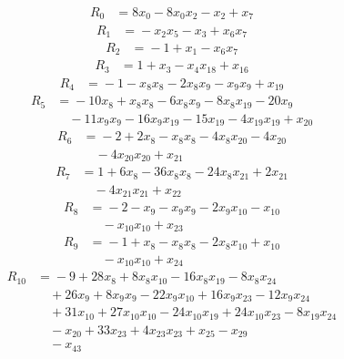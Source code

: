 \begingroup\small
\begin{align*}
R_{0}&={}8x_{0} -8x_{0}x_{2} -x_{2} +x_{7}
\end{align*}
\begin{align*}
R_{1}&={}-x_{2}x_{5} -x_{3} +x_{6}x_{7}
\end{align*}
\begin{align*}
R_{2}&={}-1 +x_{1} -x_{6}x_{7}
\end{align*}
\begin{align*}
R_{3}&={}1 +x_{3} -x_{4}x_{18} +x_{16}
\end{align*}
\begin{align*}
R_{4}&={}-1 -x_{8}x_{8} -2x_{8}x_{9} -x_{9}x_{9} +x_{19}
\end{align*}
\begin{align*}
R_{5}&={}-10x_{8} +x_{8}x_{8} -6x_{8}x_{9} -8x_{8}x_{19} -20x_{9}\\
&\quad{}-11x_{9}x_{9} -16x_{9}x_{19} -15x_{19} -4x_{19}x_{19} +x_{20}
\end{align*}
\begin{align*}
R_{6}&={}-2 +2x_{8} -x_{8}x_{8} -4x_{8}x_{20} -4x_{20}\\
&\quad{}-4x_{20}x_{20} +x_{21}
\end{align*}
\begin{align*}
R_{7}&={}1 +6x_{8} -36x_{8}x_{8} -24x_{8}x_{21} +2x_{21}\\
&\quad{}-4x_{21}x_{21} +x_{22}
\end{align*}
\begin{align*}
R_{8}&={}-2 -x_{9} -x_{9}x_{9} -2x_{9}x_{10} -x_{10}\\
&\quad{}-x_{10}x_{10} +x_{23}
\end{align*}
\begin{align*}
R_{9}&={}-1 +x_{8} -x_{8}x_{8} -2x_{8}x_{10} +x_{10}\\
&\quad{}-x_{10}x_{10} +x_{24}
\end{align*}
\begin{align*}
R_{10}&={}-9 +28x_{8} +8x_{8}x_{10} -16x_{8}x_{19} -8x_{8}x_{24}\\
&\quad{}+26x_{9} +8x_{9}x_{9} -22x_{9}x_{10} +16x_{9}x_{23} -12x_{9}x_{24}\\
&\quad{}+31x_{10} +27x_{10}x_{10} -24x_{10}x_{19} +24x_{10}x_{23} -8x_{19}x_{24}\\
&\quad{}-x_{20} +33x_{23} +4x_{23}x_{23} +x_{25} -x_{29}\\
&\quad{}-x_{43}
\end{align*}
